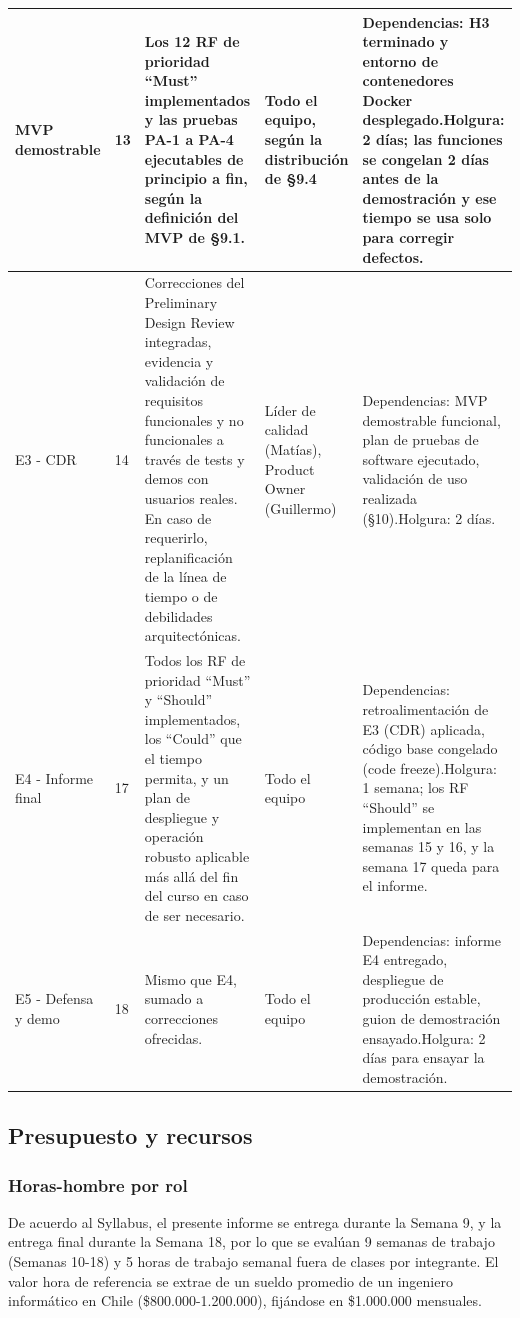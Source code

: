 \documentclass[10pt,a4paper]{article}
\begin{document}
\begin{xltabular}{\linewidth}{|P{3.4cm}|P{1.8cm}|L|P{2.6cm}|P{3.2cm}|}
MVP demostrable & 13 & Los 12 RF de prioridad ``Must'' implementados y las pruebas PA-1 a PA-4 ejecutables de principio a fin, según la definición del MVP de §9.1. & Todo el equipo, según la distribución de §9.4 & Dependencias: H3 terminado y entorno de contenedores Docker desplegado.\newline Holgura: 2 días; las funciones se congelan 2 días antes de la demostración y ese tiempo se usa solo para corregir defectos. \\ \hline
E3 - CDR & 14 & Correcciones del Preliminary Design Review integradas, evidencia y validación de requisitos funcionales y no funcionales a través de tests y demos con usuarios reales. En caso de requerirlo, replanificación de la línea de tiempo o de debilidades arquitectónicas. & Líder de calidad (Matías), Product Owner (Guillermo) & Dependencias: MVP demostrable funcional, plan de pruebas de software ejecutado, validación de uso realizada (§10).\newline Holgura: 2 días. \\ \hline
E4 - Informe final & 17 & Todos los RF de prioridad ``Must'' y ``Should'' implementados, los ``Could'' que el tiempo permita, y un plan de despliegue y operación robusto aplicable más allá del fin del curso en caso de ser necesario. & Todo el equipo & Dependencias: retroalimentación de E3 (CDR) aplicada, código base congelado (code freeze).\newline Holgura: 1 semana; los RF ``Should'' se implementan en las semanas 15 y 16, y la semana 17 queda para el informe. \\ \hline
E5 - Defensa y demo & 18 & Mismo que E4, sumado a correcciones ofrecidas. & Todo el equipo & Dependencias: informe E4 entregado, despliegue de producción estable, guion de demostración ensayado.\newline Holgura: 2 días para ensayar la demostración. \\ \hline
\end{xltabular}


\subsection{Presupuesto y recursos}
\subsubsection*{Horas-hombre por rol}

De acuerdo al Syllabus, el presente informe se entrega durante la Semana 9, y la entrega final durante la Semana 18, por lo que se evalúan 9 semanas de trabajo (Semanas 10-18) y 5 horas de trabajo semanal fuera de clases por integrante. El valor hora de referencia se extrae de un sueldo promedio de un ingeniero informático en Chile (\$800.000-1.200.000), fijándose en \$1.000.000 mensuales.
\end{document}
